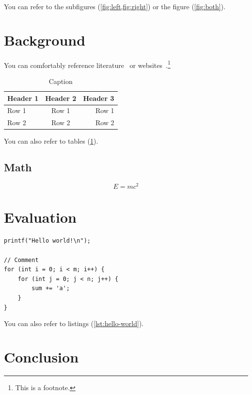 \documentclass[
	12pt,
	a4paper,
	bibliography=totoc,
	numbers=endperiod,
	parskip=half,
]{scrartcl}
\begin{document}
You can refer to the subfigures (\cref{fig:left,fig:right}) or the figure (\cref{fig:both}).

\section{Background}
\label{sec:background}

You can comfortably reference literature~\cite{DBLP:journals/superfri/DuweLMSF0B020} or websites~\cite{WWW:ParCIO-Blog}.\footnote{This is a footnote.}

\begin{table}[ht]
	\centering
	\begin{tabular}{|l|c|r|}
		\hline
		\textbf{Header 1} & \textbf{Header 2} & \textbf{Header 3} \\
		\hline
		\hline
		Row 1 & Row 1 & Row 1 \\
		Row 2 & Row 2 & Row 2 \\
		\hline
	\end{tabular}
	\caption{Caption}
	\label{tab:table}
\end{table}

You can also refer to tables (\cref{tab:table}).

\subsection{Math}

\[
	E = m c^2
\]

\section{Evaluation}
\label{sec:evaluation}

\begin{listing}[ht]
\begin{verbatim}
printf("Hello world!\n");

// Comment
for (int i = 0; i < m; i++) {
	for (int j = 0; j < n; j++) {
		sum += 'a';
	}
}
\end{verbatim}
\caption{Caption}
\label{lst:hello-world}
\end{listing}

You can also refer to listings (\cref{lst:hello-world}).

\section{Conclusion}
\label{sec:conclusion}


\lipsum[1-3]

\newpage



\end{document}
